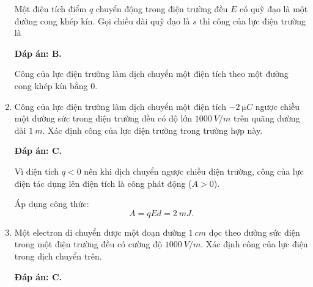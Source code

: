 \begin{enumerate}[label=\bfseries Câu \arabic*:]
	\cauhoi
	{Một điện tích điểm $q$ chuyển động trong điện trường đều $E$ có quỹ đạo là một đường cong khép kín. Gọi chiều dài quỹ đạo là $s$ thì công của lực điện trường là
		
	}
	\loigiai
	{	\textbf{Đáp án: B.}
		
		Công của lực điện trường làm dịch chuyển một điện tích theo một đường cong khép kín bằng 0.
	}
	\item {}
	
	\cauhoi
	{Công của lực điện trường làm dịch chuyển một điện tích $\SI{-2}{\micro C}$ ngược chiều một đường sức trong điện trường đều có độ lớn $\SI{1000}{V/m}$ trên quãng đường dài $\SI{1}{m}$. Xác định công của lực điện trường trong trường hợp này.
		
	}
	\loigiai
	{	\textbf{Đáp án: C.}
		
		Vì điện tích $q<0$ nên khi dịch chuyển ngược chiều điện trường, công của lực điện tác dụng lên điện tích là công phát động ($A>0$).
		
		Áp dụng công thức:
		$$A=qEd  =\SI{2}{mJ}.$$
	}
	\item {}
	
	\cauhoi
	{Một electron di chuyển được một đoạn đường $\SI{1}{cm}$ dọc theo đường sức điện trong một điện trường đều có cường độ $\SI{1000}{V/m}$. Xác định công của lực điện trong dịch chuyển trên.
		
	}
	\loigiai
	{	\textbf{Đáp án: C.}
		
}
\end{enumerate}

